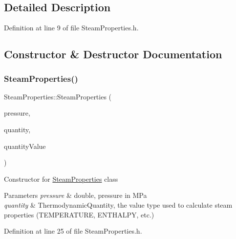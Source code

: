 \subsection{Detailed Description}


Definition at line 9 of file Steam\+Properties.\+h.



\subsection{Constructor \& Destructor Documentation}
\mbox{\label{class_steam_properties_a976e08ed0433943d469a8c2f75d2ac68}} 
\subsubsection{\texorpdfstring{Steam\+Properties()}{SteamProperties()}\hspace{0.1cm}{\footnotesize\ttfamily [1/3]}}
{\footnotesize\ttfamily Steam\+Properties\+::\+Steam\+Properties (\begin{DoxyParamCaption}\item[{const double}]{pressure,  }\item[{const \hyperlink{class_steam_properties_ae0294bedf7d178c2d8fb6aed0f62fbff}{Thermodynamic\+Quantity}}]{quantity,  }\item[{const double}]{quantity\+Value }\end{DoxyParamCaption})\hspace{0.3cm}{\ttfamily [inline]}}

Constructor for \hyperlink{class_steam_properties}{Steam\+Properties} class 
\begin{DoxyParams}{Parameters}
{\em pressure} & double, pressure in M\+Pa \\
\hline
{\em quantity} & Thermodynamic\+Quantity, the value type used to calculate steam properties (T\+E\+M\+P\+E\+R\+A\+T\+U\+RE, E\+N\+T\+H\+A\+L\+PY, etc.) \\
\hline
\end{DoxyParams}


Definition at line 25 of file Steam\+Properties.\+h.

\mbox{\label{class_steam_properties_a976e08ed0433943d469a8c2f75d2ac68}} 
